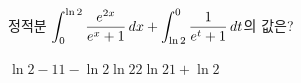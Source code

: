 정적분 $\displaystyle\int_{0}^{\ln 2}\dfrac{e^{2x}}{e^x+1}\mkern3mu dx+\int_{\ln 2}^{0}\dfrac{1}{e^t+1}\mkern3mu dt$의 값은?
\begin{choices32}{$\ln 2-1$}{$1-\ln 2$}{$\ln 2$}{$2\ln 2$}{$1+\ln 2$}\end{choices32}

